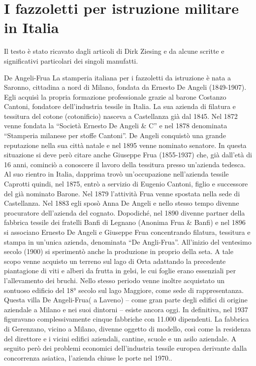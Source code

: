 \chapter[]{I fazzoletti per istruzione militare in Italia}
\graphicspath{ {./images/chapter3/} }

Il testo è stato ricavato dagli articoli di Dirk  Ziesing e da alcune scritte e significativi particolari dei singoli manufatti. 



De Angeli-Frua
   La stamperia italiana per i fazzoletti da istruzione è nata a Saronno, cittadina a nord di Milano,  fondata da Ernesto De Angeli (1849-1907). Egli acquisì la propria formazione professionale grazie al barone Costanzo Cantoni, fondatore dell’industria tessile in Italia. La sua azienda di filatura e tessitura del cotone (cotonificio) nasceva a Castellanza già dal 1845. Nel 1872 venne fondata la “Società Ernesto De Angeli \& C” e nel 1878 denominata “Stamperia milanese per stoffe Cantoni”. De Angeli conquistò una grande reputazione nella sua città natale e nel 1895 venne nominato senatore.
   In questa situazione si deve però citare anche Giuseppe Frua (1855-1937) che, già dall’età di 16 anni, cominciò a conoscere il lavoro della tessitura presso un’azienda tedesca. Al suo rientro in Italia, dapprima trovò un’occupazione nell’azienda tessile Caprotti quindi, nel 1875, entrò a servizio di Eugenio Cantoni, figlio e successore del già nominato Barone. Nel 1879 l’attività Frua venne spostata nella sede di Castellanza. Nel 1883 egli sposò Anna De Angeli e nello stesso tempo divenne procuratore dell’azienda del cognato. Dopodiché, nel 1890 divenne partner della fabbrica tessile dei fratelli Banfi di Legnano (Anonima Frua \& Banfi) e nel 1896 si associano Ernesto De Angeli e Giuseppe Frua concentrando filatura, tessitura e stampa in un’unica azienda, denominata “De Angli-Frua”.
   All’inizio del ventesimo secolo (1900) si sperimentò  anche  la  
produzione  in  proprio  della  seta. A tale scopo    venne acquisto un terreno sul lago di Orta adattando la precedente piantagione di viti e alberi da frutta in gelsi, le cui foglie erano essenziali per l’allevamento dei bruchi. Nello stesso periodo venne inoltre acquistato un sontuoso edificio del 18° secolo sul lago Maggiore, come sede di rappresentanza. Questa villa De Angeli-Frua( a Laveno) – come gran parte degli edifici di origine aziendale a Milano e nei suoi dintorni – esiste ancora oggi.
   In definitiva, nel 1937 figuravano complessivamente cinque fabbriche con 11.000 dipendenti. La fabbrica di Gerenzano, vicino a Milano, divenne oggetto di modello, così come la residenza del direttore e i vicini edifici aziendali, cantine, scuole e un asilo aziendale. A seguito però dei problemi economici dell’industria tessile europea derivante dalla concorrenza asiatica, l’azienda chiuse le porte nel 1970..

